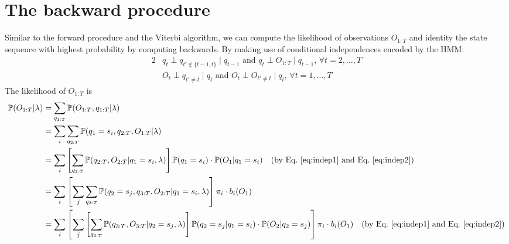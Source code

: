 \section{The backward procedure}
\label{sec:backward}

Similar to the forward procedure and the Viterbi algorithm, 
we can compute the likelihood of observations $O_{1:T}$ and identity the state sequence with highest probability by computing backwards.
By making use of conditional independences encoded by the HMM:
\begin{alignat}{2}
& q_t \perp q_{t' \notin \{t-1,t\}} \mid q_{t-1} \text{~and~} q_t \perp O_{1:T} \mid q_{t-1}, \, \forall t=2,\dots,T  \label{eq:indep1} \\
& O_t \perp q_{t' \ne t} \mid q_t \text{~and~} O_t \perp O_{t' \ne t} \mid q_t, \, \forall t=1,\dots,T                \label{eq:indep2}
\end{alignat}
The likelihood of $O_{1:T}$ is 
\begin{align*}
\mathbb{P}(O_{1:T} |\lambda) 
&= \sum_{q_{1:T}} \mathbb{P}(O_{1:T},q_{1:T} |\lambda) \\
&= \sum_{i} \sum_{q_{2:T}} \mathbb{P}(q_1 = s_i, q_{2:T}, O_{1:T} |\lambda) \\
&= \sum_{i} \left[ \sum_{q_{2:T}} \mathbb{P}(q_{2:T}, O_{2:T} |q_1 = s_i, \lambda) \right] \mathbb{P}(q_1 = s_i) \cdot \mathbb{P}(O_1 |q_1 = s_i) 
   ~~~ \text{(by Eq.~\ref{eq:indep1} and Eq.~\ref{eq:indep2})} \\
&= \sum_{i} \left[ \sum_{j} \sum_{q_{3:T}} \mathbb{P}(q_2 = s_j, q_{3:T}, O_{2:T} |q_1 = s_i, \lambda) \right] \pi_i \cdot b_i(O_1) \\
&= \sum_{i} \left[ \sum_{j} \left[ \sum_{q_{3:T}} \mathbb{P}(q_{3:T}, O_{3:T} |q_2 = s_j, \lambda) \right] \mathbb{P}(q_2 = s_j |q_1 = s_i) \cdot \mathbb{P}(O_2 |q_2 = s_j) 
   \right] \pi_i \cdot b_i(O_1) 
   ~~~ \text{(by Eq.~\ref{eq:indep1} and Eq.~\ref{eq:indep2})}
\end{align*}


